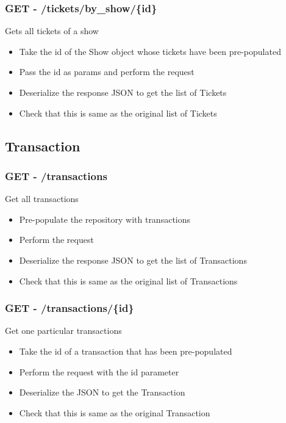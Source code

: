 \documentclass[]{article}
\providecommand{\tightlist}{%
  \setlength{\itemsep}{0pt}\setlength{\parskip}{0pt}}
\begin{document}
\hypertarget{get---ticketsby_showid}{%
\subsubsection{GET -
/tickets/by\_show/\{id\}}\label{get---ticketsby_showid}}

Gets all tickets of a show

\begin{itemize}
\tightlist
\item
  Take the id of the Show object whose tickets have been pre-populated
\item
  Pass the id as params and perform the request
\item
  Deserialize the response JSON to get the list of Tickets
\item
  Check that this is same as the original list of Tickets
\end{itemize}

\hypertarget{transaction}{%
\subsection{Transaction}\label{transaction}}

\hypertarget{get---transactions}{%
\subsubsection{GET - /transactions}\label{get---transactions}}

Get all transactions

\begin{itemize}
\tightlist
\item
  Pre-populate the repository with transactions
\item
  Perform the request
\item
  Deserialize the response JSON to get the list of Transactions
\item
  Check that this is same as the original list of Transactions
\end{itemize}

\hypertarget{get---transactionsid}{%
\subsubsection{GET - /transactions/\{id\}}\label{get---transactionsid}}

Get one particular transactions

\begin{itemize}
\tightlist
\item
  Take the id of a transaction that has been pre-populated
\item
  Perform the request with the id parameter
\item
  Deserialize the JSON to get the Transaction
\item
  Check that this is same as the original Transaction
\end{itemize}
\end{document}
